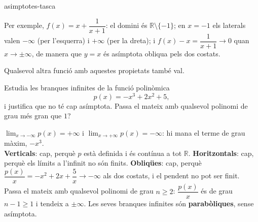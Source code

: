 \begin{apartats}
\begin{tria}{asimptotes-tasca}
\begin{solucio}
Per exemple, $f(x)=x+\dfrac{1}{x+1}$: el domini és $\mathbb{R}\setminus\{-1\}$; en $x=-1$ els laterals
valen $-\infty$ (per l'esquerra) i $+\infty$ (per la dreta); i $f(x)-x=\dfrac{1}{x+1}\to0$ quan
$x\to\pm\infty$, de manera que $y=x$ és asímptota obliqua pels dos costats.
\begin{center}
\end{center}
Qualsevol altra funció amb aquestes propietats també val.
\end{solucio}

Estudia les branques infinites de la funció polinòmica
\[
p(x)=-x^3+2x^2+5 ,
\]
i justifica que no té cap asímptota. Passa el mateix amb qualsevol polinomi de grau més gran que $1$?

\begin{solucio}
$\lim_{x\to-\infty}p(x)=+\infty$ i $\lim_{x\to+\infty}p(x)=-\infty$: hi mana el terme de grau màxim,
$-x^3$.\\
\textbf{Verticals}: cap, perquè $p$ està definida i és contínua a tot $\mathbb{R}$.
\textbf{Horitzontals}: cap, perquè els límits a l'infinit no són finits. \textbf{Obliqües}: cap,
perquè $\dfrac{p(x)}{x}=-x^2+2x+\dfrac5x\to-\infty$ als dos costats, i el pendent no pot ser finit.\\
Passa el mateix amb qualsevol polinomi de grau $n\ge2$: $\dfrac{p(x)}{x}$ és de grau $n-1\ge1$ i
tendeix a $\pm\infty$. Les seves branques infinites són \textbf{parabòliques}, sense asímptota.
\end{solucio}
\end{tria}

\end{apartats}
